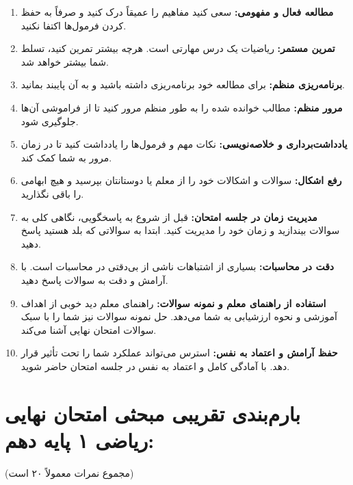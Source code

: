 \documentclass[12pt,a4paper]{article}
\begin{document}
\begin{enumerate}
    \item \textbf{مطالعه فعال و مفهومی:} سعی کنید مفاهیم را عمیقاً درک کنید و صرفاً به حفظ کردن فرمول‌ها اکتفا نکنید.
    \item \textbf{تمرین مستمر:} ریاضیات یک درس مهارتی است. هرچه بیشتر تمرین کنید، تسلط شما بیشتر خواهد شد.
    \item \textbf{برنامه‌ریزی منظم:} برای مطالعه خود برنامه‌ریزی داشته باشید و به آن پایبند بمانید.
    \item \textbf{مرور منظم:} مطالب خوانده شده را به طور منظم مرور کنید تا از فراموشی آن‌ها جلوگیری شود.
    \item \textbf{یادداشت‌برداری و خلاصه‌نویسی:} نکات مهم و فرمول‌ها را یادداشت کنید تا در زمان مرور به شما کمک کند.
    \item \textbf{رفع اشکال:} سوالات و اشکالات خود را از معلم یا دوستانتان بپرسید و هیچ ابهامی را باقی نگذارید.
    \item \textbf{مدیریت زمان در جلسه امتحان:} قبل از شروع به پاسخگویی، نگاهی کلی به سوالات بیندازید و زمان خود را مدیریت کنید. ابتدا به سوالاتی که بلد هستید پاسخ دهید.
    \item \textbf{دقت در محاسبات:} بسیاری از اشتباهات ناشی از بی‌دقتی در محاسبات است. با آرامش و دقت به سوالات پاسخ دهید.
    \item \textbf{استفاده از راهنمای معلم و نمونه سوالات:} راهنمای معلم دید خوبی از اهداف آموزشی و نحوه ارزشیابی به شما می‌دهد. حل نمونه سوالات نیز شما را با سبک سوالات امتحان نهایی آشنا می‌کند.
    \item \textbf{حفظ آرامش و اعتماد به نفس:} استرس می‌تواند عملکرد شما را تحت تأثیر قرار دهد. با آمادگی کامل و اعتماد به نفس در جلسه امتحان حاضر شوید.
\end{enumerate}

\section*{بارم‌بندی تقریبی مبحثی امتحان نهایی ریاضی ۱ پایه دهم:}

(مجموع نمرات معمولاً ۲۰ است)
\end{document}
